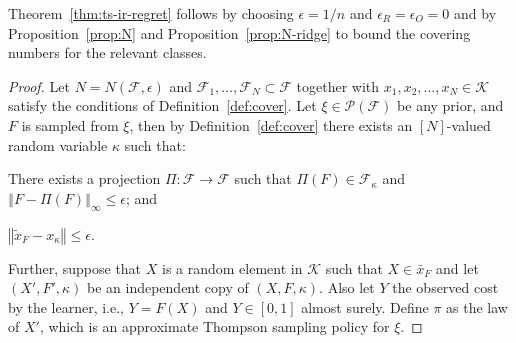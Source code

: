 \documentclass[letter, 12pt]{report}
\newcommand{\epsR}{{\epsilon_R}}
\newcommand{\epsO}{{\epsilon_O}}
\newcommand{\norm}[1]{\left \Vert  #1 \right \Vert}
\newcommand{\cK}{\mathcal K}
\newcommand{\sF}{\mathscr F}
\newcommand{\sP}{\mathscr P}
\newcommand{\1}{\mathbf{1}}
\theoremstyle{plain}
\theoremstyle{definition}
\theoremstyle{remark}
\begin{document}
Theorem~\ref{thm:ts-ir-regret} follows by choosing $\epsilon = 1/n$ and $\epsR = \epsO = 0$ and by
Proposition~\ref{prop:N} and Proposition~\ref{prop:N-ridge} to bound the covering numbers for the relevant classes.

\begin{proof}
    Let $N = N(\sF, \epsilon)$
    and $\sF_1,\ldots,\sF_N \subset \sF$ together with $x_1, x_2, \ldots, x_N \in \cK$ satisfy the conditions of Definition~\ref{def:cover}.
    Let $\xi \in \sP(\sF)$ be any prior, and $F$ is sampled from $\xi$, then
    by Definition~\ref{def:cover} there exists an $[N]$-valued random variable $\kappa$ such that:
    \begin{enumroman}
        \item There exists a projection $\Pi:\sF \to \sF$ such that
        $\Pi(F) \in \sF_\kappa$ and $\norm{F - \Pi(F)}_\infty \leq \epsilon$; and \label{proof:ir:i}
        \item $\norm{\tilde x_F - x_\kappa} \leq \epsilon$. \label{proof:ir:ii}
    \end{enumroman}
    Further, suppose that $X$ is a random element in $\cK$ such that $X \in \bar x_F$ and let $(X', F', \kappa)$ be an independent copy of $(X, F, \kappa)$.
    Also let $Y$ the observed cost by the learner, i.e., $Y = F(X)$ and
    $Y \in [0,1]$ almost surely.
    Define $\pi$ as the law of $X'$, which is an approximate Thompson sampling policy for $\xi$.


\end{proof}
\end{document}
